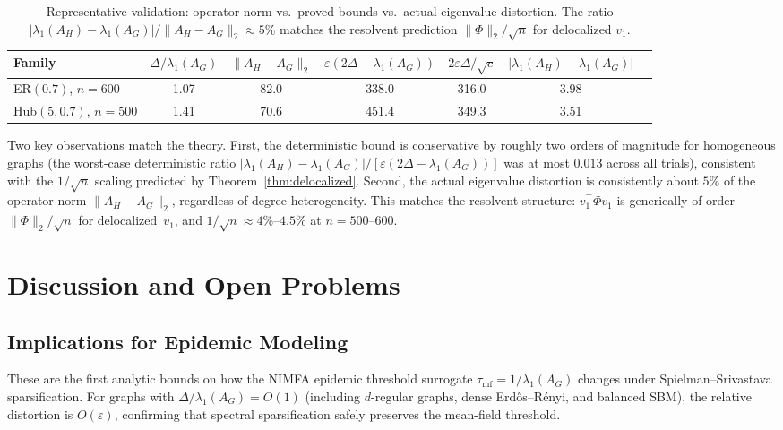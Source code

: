 \documentclass[11pt]{article}
\theoremstyle{definition}
\newcommand{\eps}{\varepsilon}
\newcommand{\lamH}{\lambda_1(A_H)}
\newcommand{\lamG}{\lambda_1(A_G)}
\newcommand{\AG}{A_G}
\newcommand{\AH}{A_H}
\newcommand{\vone}{v_1}
\begin{document}
\begin{table}[ht]
\centering
\caption{Representative validation: operator norm vs.\ proved bounds vs.\ actual
eigenvalue distortion. The ratio $|\lamH{-}\lamG|/\|\AH{-}\AG\|_2 \approx 5\%$
matches the resolvent prediction $\|\Phi\|_2/\sqrt{n}$ for delocalized $\vone$.}
\label{tab:validation}
\begin{tabular}{@{}lcccccc@{}}
\toprule
Family & $\Delta/\lamG$ & $\|\AH{-}\AG\|_2$ & $\eps(2\Delta{-}\lamG)$
& $2\eps\Delta/\!\sqrt{c}$ & $|\lamH{-}\lamG|$ \\
\midrule
ER$(0.7)$, $n{=}600$    & 1.07 & 82.0 & 338.0 & 316.0 & 3.98 \\
Hub$(5, 0.7)$, $n{=}500$  & 1.41 & 70.6 & 451.4 & 349.3 & 3.51 \\
\bottomrule
\end{tabular}
\end{table}

Two key observations match the theory. First, the deterministic bound is conservative by
roughly two orders of magnitude for homogeneous graphs (the worst-case deterministic ratio
$|\lamH - \lamG|/[\eps(2\Delta - \lamG)]$ was at most $0.013$ across all trials),
consistent with the $1/\sqrt{n}$ scaling predicted by Theorem~\ref{thm:delocalized}.
Second, the actual eigenvalue distortion is consistently about $5\%$ of the operator
norm $\|\AH - \AG\|_2$, regardless of degree heterogeneity. This matches the resolvent
structure: $\vone^\top \Phi\vone$ is generically of order $\|\Phi\|_2/\sqrt{n}$
for delocalized~$\vone$, and $1/\sqrt{n} \approx 4\%$--$4.5\%$ at $n = 500$--$600$.


\section{Discussion and Open Problems}\label{sec:discussion}

\subsection{Implications for Epidemic Modeling}

These are the first analytic bounds on how the NIMFA
epidemic threshold surrogate $\tau_{\mathrm{mf}} = 1/\lamG$ changes under
Spielman--Srivastava sparsification. For graphs with $\Delta/\lamG = O(1)$
(including $d$-regular graphs, dense Erd\H{o}s--R\'{e}nyi, and balanced SBM),
the relative distortion is $O(\eps)$, confirming that spectral sparsification
safely preserves the mean-field threshold.
\end{document}
